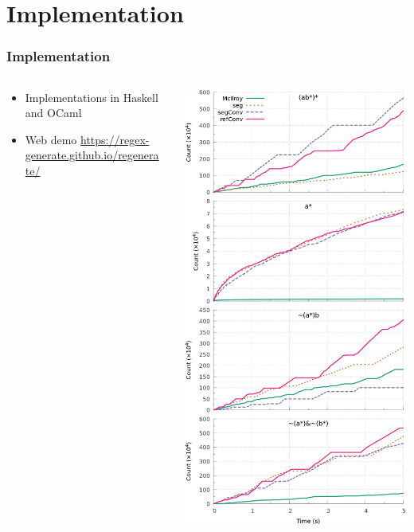 \documentclass[pdftex,aspectratio=169]{beamer}
\begin{document}
\section{Implementation}
\begin{frame}
  \frametitle{Implementation}
  \begin{columns}
    \begin{column}{0.3\textwidth}
  \begin{itemize}
  \item Implementations in Haskell and OCaml
  \item Web demo \url{https://regex-generate.github.io/regenerate/}
  \end{itemize}
  \vspace{10cm}
\end{column}
\begin{column}{0.69\textwidth}
  \begin{center}
    \includegraphics[scale=0.2]{../measure/haskell_all.png}

\end{center}
\end{column}
\end{columns}
\end{frame}
\end{document}
